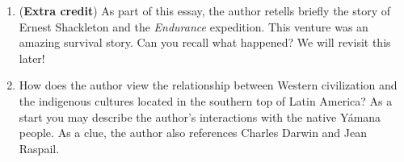 \documentclass{article}
\begin{document}
\begin{enumerate}
\item (\textbf{Extra credit}) As part of this essay, the author retells briefly the story of Ernest Shackleton and the \textit{Endurance} expedition.  This venture was an amazing survival story.  Can you recall what happened?  We will revisit this later! \\ \vspace{2cm}
\item How does the author view the relationship between Western civilization and the indigenous cultures located in the southern top of Latin America?  As a start you may describe the author's interactions with the native Y\'{a}mana people.  As a clue, the author also references Charles Darwin and Jean Raspail.
\end{enumerate}
\end{document}
